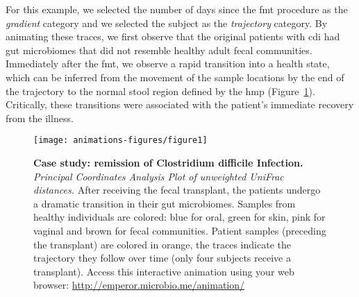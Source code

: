 For this example, we selected the number of days since the \gls{fmt} procedure as the \textit{gradient} category and we selected the subject as the \textit{trajectory} category. By animating these traces, we first observe that the original patients with \gls{cdi} had gut microbiomes that did not resemble healthy adult fecal communities. Immediately after the \gls{fmt}, we observe a rapid transition into a health state, which can be inferred from the movement of the sample locations by the end of the trajectory to the normal stool region defined by the \gls{hmp} (Figure~\ref{anim_fig1}). Critically, these transitions were associated with the patient's immediate recovery from the illness.

\begin{figure}[htbp]
\texttt{[image: animations-figures/figure1]}
\caption[Case study: remission of Clostridium difficile Infection]{\textbf{Case study: remission of Clostridium difficile Infection.} \textit{Principal Coordinates Analysis Plot of unweighted UniFrac distances.} After receiving the fecal transplant, the patients undergo a dramatic transition in their gut microbiomes. Samples from healthy individuals are colored: blue for oral, green for skin, pink for vaginal and brown for fecal communities. Patient samples (preceding the transplant) are colored in orange, the traces indicate the trajectory they follow over time (only four subjects receive a transplant). Access this interactive animation using your web browser: \url{http://emperor.microbio.me/animation/}}
\label{anim_fig1}
\end{figure}


